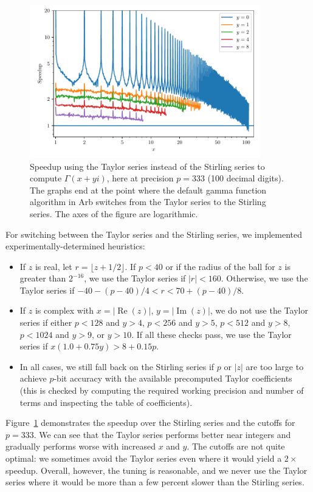 \documentclass[reqno]{amsart}
\newcommand{\Real}{\operatorname{Re}}
\newcommand{\Imag}{\operatorname{Im}}
\theoremstyle{definition}
\begin{document}
\begin{figure}
\caption{Speedup using the Taylor series instead of the Stirling series to compute $\Gamma(x+yi)$, here at precision $p = 333$ (100 decimal digits). The
graphs end at the point where the default gamma function algorithm in Arb switches from the Taylor series to the Stirling series. The
axes of the figure are logarithmic. \label{fig:taylorspeed}}
\includegraphics[width=10cm]{taylorspeed}
\end{figure}

For switching between the Taylor series and the Stirling series,
we implemented experimentally-determined heuristics:

\begin{itemize}
\item If $z$ is real, let $r = \lfloor z + 1/2 \rfloor$.
      If $p < 40$ or if the radius of the ball for $z$ is greater than $2^{-16}$,
      we use the Taylor series if $|r| < 160$.
      Otherwise, we use the Taylor series if $-40 - (p - 40) / 4 < r < 70 + (p - 40) / 8$.
\item If $z$ is complex with $x = |\Real(z)|$, $y = |\Imag(z)|$, we do not use the Taylor series
      if either $p < 128$ and $y > 4$, $p < 256$ and $y > 5$,
      $p < 512$ and $y > 8$, $p < 1024$ and $y > 9$, or $y > 10$.
      If all these checks pass, we use the Taylor series if $x (1.0 + 0.75y) > 8 + 0.15p$.
\item In all cases, we still fall back on the Stirling series if $p$ or $|z|$
      are too large to achieve $p$-bit accuracy with the available precomputed Taylor coefficients
      (this is checked by computing the required working precision and number of terms
      and inspecting the table of coefficients).
\end{itemize}

Figure~\ref{fig:taylorspeed} demonstrates the
speedup over the Stirling series and the cutoffs for $p = 333$.
We can see that the Taylor series
performs better near integers
and gradually performs worse with increased $x$ and $y$.
The cutoffs are not quite optimal: we sometimes avoid the Taylor series
even where it would yield a $2\times$ speedup.
Overall, however, the tuning is reasonable, and we never use
the Taylor series where it would be more than a few percent
slower than the Stirling series.
\end{document}
